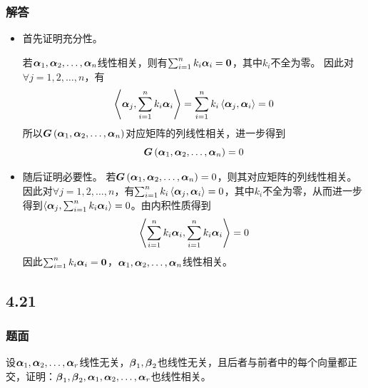 \documentclass{beamer}
\begin{document}
\begin{frame}[allowframebreaks]
    \frametitle{解答}
    \begin{itemize}
        \item {
              首先证明充分性。

              若\(\enums{\vecal}{n}\)线性相关，则有\(\sum_{i=1}^nk_i\vecal_i=\veczero\)，其中\(k_i\)不全为零。
              因此对\(\forall j=1,2,\dots,n\)，有
              \begin{equation*}
                  \indot{\vecal_j}{\sum_{i=1}^nk_i\vecal_i}=\sum_{i=1}^nk_i\indot{\vecal_j}{\vecal_i}=0
              \end{equation*}
              所以\(\gram{\enums{\vecal}{n}}\)对应矩阵的列线性相关，进一步得到
              \begin{equation*}
                  \gram{\enums{\vecal}{n}}=0
              \end{equation*}
              }
        \item {
              随后证明必要性。
              若\(\gram{\enums{\vecal}{n}}=0\)，则其对应矩阵的列线性相关。因此对\(\forall j=1,2,\dots,n\)，有\(\sum_{i=1}^nk_i\indot{\vecal_j}{\vecal_i}=0\)，其中\(k_i\)不全为零，从而进一步得到\(\indot{\vecal_j}{\sum_{i=1}^nk_i\vecal_i}=0\)。由内积性质得到
              \begin{equation*}
                  \indot{\sum_{i=1}^nk_i\vecal_i}{\sum_{i=1}^nk_i\vecal_i}=0
              \end{equation*}
              因此\(\sum_{i=1}^nk_i\vecal_i=\veczero\)，\(\enums{\vecal}{n}\)线性相关。
              }
    \end{itemize}
\end{frame}

\subsection*{4.21}
\begin{frame}
    \frametitle{题面}
    设\(\enums{\vecal}{r}\)线性无关，\(\vecbeta_1,\vecbeta_2\)也线性无关，且后者与前者中的每个向量都正交，证明：\(\vecbeta_1,\vecbeta_2,\enums{\vecal}{r}\)也线性相关。
\end{frame}
\end{document}
